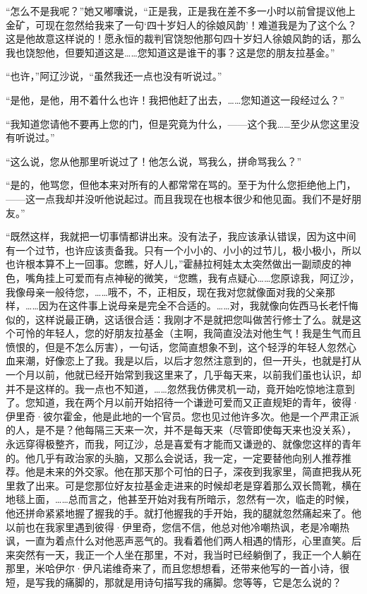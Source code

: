 \par “怎么不是我呢？”她又嘟囔说，“正是我，正是我在差不多一小时以前曾提议他上金矿，可现在忽然给我来了一句‘四十岁妇人的徐娘风韵’！难道我是为了这个么？这是他故意这样说的！愿永恒的裁判官饶恕他那句四十岁妇人徐娘风韵的话，那么我也饶恕他，但要知道这是……您知道这是谁干的事？这是您的朋友拉基金。”
\par “也许，”阿辽沙说，“虽然我还一点也没有听说过。”
\par “是他，是他，用不着什么也许！我把他赶了出去，……您知道这一段经过么？”
\par “我知道您请他不要再上您的门，但是究竟为什么，——这个我……至少从您这里没有听说过。”
\par “这么说，您从他那里听说过了！他怎么说，骂我么，拼命骂我么？”
\par “是的，他骂您，但他本来对所有的人都常常在骂的。至于为什么您拒绝他上门，——这一点我却并没听他说起过。而且我现在也根本很少和他见面。我们不是好朋友。”
\par “既然这样，我就把一切事情都讲出来。没有法子，我应该承认错误，因为这中间有一个过节，也许应该责备我。只有一个小小的、小小的过节儿，极小极小，所以也许根本算不上一回事。您瞧，好人儿，”霍赫拉柯娃太太突然做出一副顽皮的神色，嘴角挂上可爱而有点神秘的微笑，“您瞧，我有点疑心……您原谅我，阿辽沙，我像母亲一般待您，……哦不，不，正相反，现在我对您就像面对我的父亲那样，……因为在这件事上说母亲是完全不合适的。……对，我就像向佐西马长老忏悔似的，这样说最正确，这话很合适：我刚才不是就把您叫做苦行修士了么。就是这个可怜的年轻人，您的好朋友拉基金（主啊，我简直没法对他生气！我是生气而且愤恨的，但是不怎么厉害），一句话，您简直想象不到，这个轻浮的年轻人忽然心血来潮，好像恋上了我。我是以后，以后才忽然注意到的，但一开头，也就是打从一个月以前，他就已经开始常到我这里来了，几乎每天来，以前我们虽也认识，却并不是这样的。我一点也不知道，……忽然我仿佛灵机一动，竟开始吃惊地注意到了。您知道，我在两个月以前开始招待一个谦逊可爱而又正直规矩的青年，彼得·伊里奇·彼尔霍金，他是此地的一个官员。您也见过他许多次。他是一个严肃正派的人，是不是？他每隔三天来一次，并不是每天来（尽管即使每天来也没关系），永远穿得极整齐，而我，阿辽沙，总是喜爱有才能而又谦逊的、就像您这样的青年的。他几乎有政治家的头脑，又那么会说话，我一定，一定要替他向别人推荐推荐。他是未来的外交家。他在那天那个可怕的日子，深夜到我家里，简直把我从死里救了出来。可是您那位好友拉基金走进来的时候却老是穿着那么双长筒靴，横在地毯上面，……总而言之，他甚至开始对我有所暗示，忽然有一次，临走的时候，他还拼命紧紧地握了握我的手。就打他握我的手开始，我的腿就忽然痛起来了。他以前也在我家里遇到彼得·伊里奇，您信不信，他总对他冷嘲热讽，老是冷嘲热讽，一直为着点什么对他恶声恶气的。我看着他们两人相遇的情形，心里直笑。后来突然有一天，我正一个人坐在那里，不对，我当时已经躺倒了，我正一个人躺在那里，米哈伊尔·伊凡诺维奇来了，而且您想想看，还带来他写的一首小诗，很短，是写我的痛脚的，那就是用诗句描写我的痛脚。您等等，它是怎么说的？
